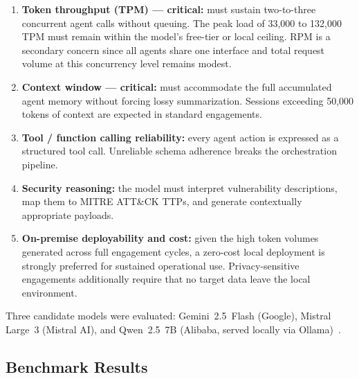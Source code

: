 \documentclass[12pt,a4paper]{report}
\begin{document}
\begin{enumerate}
    \item \textbf{Token throughput (TPM) --- critical:} must sustain two-to-three
    concurrent agent calls without queuing. The peak load of 33{,}000 to
    132{,}000 TPM must remain within the model's free-tier or local ceiling.
    RPM is a secondary concern since all agents share one interface and total
    request volume at this concurrency level remains modest.
    \item \textbf{Context window --- critical:} must accommodate the full
    accumulated agent memory without forcing lossy summarization. Sessions
    exceeding 50{,}000 tokens of context are expected in standard engagements.
    \item \textbf{Tool / function calling reliability:} every agent action is
    expressed as a structured tool call. Unreliable schema adherence breaks
    the orchestration pipeline.
    \item \textbf{Security reasoning:} the model must interpret vulnerability
    descriptions, map them to MITRE ATT\&CK TTPs, and generate contextually
    appropriate payloads.
    \item \textbf{On-premise deployability and cost:} given the high token
    volumes generated across full engagement cycles, a zero-cost local
    deployment is strongly preferred for sustained operational use.
    Privacy-sensitive engagements additionally require that no target data
    leave the local environment.
\end{enumerate}

Three candidate models were evaluated: Gemini~2.5~Flash (Google),
Mistral Large~3 (Mistral AI), and Qwen~2.5~7B (Alibaba, served locally via
Ollama)~\cite{qwen25report}.

\subsection{Benchmark Results}
\end{document}
